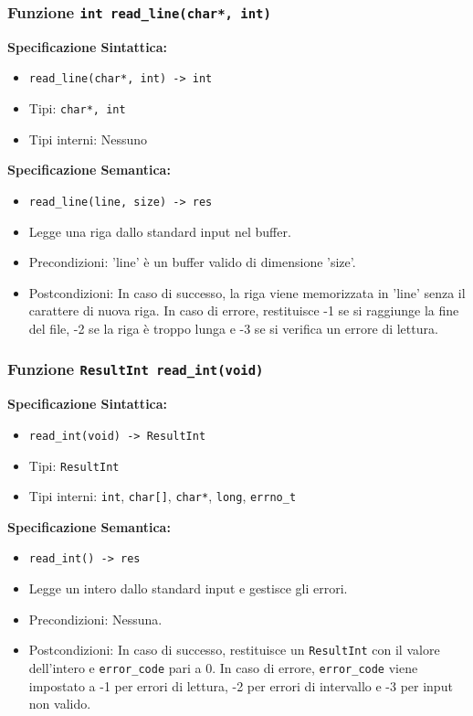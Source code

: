 \documentclass[11pt]{scrartcl} %
\begin{document}
\subsubsection{Funzione \texttt{int read\_line(char*, int)}}

\textbf{Specificazione Sintattica:}
\begin{itemize}
	\item \texttt{read\_line(char*, int) -> int}
	\item Tipi: \texttt{char*, int}
	\item Tipi interni: Nessuno
\end{itemize}

\textbf{Specificazione Semantica:}
\begin{itemize}
	\item \texttt{read\_line(line, size) -> res}
	\item Legge una riga dallo standard input nel buffer.
	\item Precondizioni: 'line' è un buffer valido di dimensione 'size'.
	\item Postcondizioni: In caso di successo, la riga viene memorizzata in 'line' senza il carattere di nuova riga. In caso di errore, restituisce -1 se si raggiunge la fine del file, -2 se la riga è troppo lunga e -3 se si verifica un errore di lettura.
\end{itemize}

\subsubsection{Funzione \texttt{ResultInt read\_int(void)}}

\textbf{Specificazione Sintattica:}
\begin{itemize}
	\item \texttt{read\_int(void) -> ResultInt}
	\item Tipi: \texttt{ResultInt}
	\item Tipi interni: \texttt{int}, \texttt{char[]}, \texttt{char*}, \texttt{long}, \texttt{errno\_t}
\end{itemize}

\textbf{Specificazione Semantica:}
\begin{itemize}
	\item \texttt{read\_int() -> res}
	\item Legge un intero dallo standard input e gestisce gli errori.
	\item Precondizioni: Nessuna.
	\item Postcondizioni: In caso di successo, restituisce un \texttt{ResultInt} con il valore dell'intero e \texttt{error\_code} pari a 0. In caso di errore, \texttt{error\_code} viene impostato a -1 per errori di lettura, -2 per errori di intervallo e -3 per input non valido.
\end{itemize}
\end{document}
